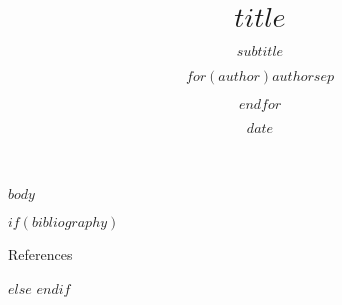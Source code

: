 \documentclass[aspectratio=169,12pt]{beamer}
\title{$title$}
\subtitle{$subtitle$}
\author{$for(author)$$author$$sep$ \and $endfor$}
\date{$date$}
\institute{$for(institute)$$institute$$sep$ \and $endfor$}
\begin{document}
\frame{\maketitle}

$body$


$if(bibliography)$
\begin{frame}[allowframebreaks]{References}
  \printbibliography[heading=none]
\end{frame}
$else$
$endif$
\end{document}
